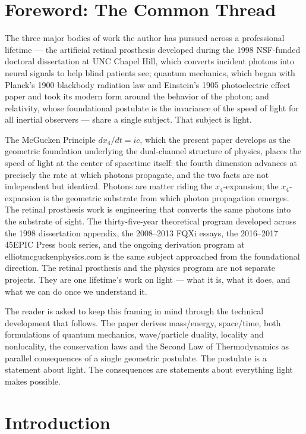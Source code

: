 \documentclass[11pt,a4paper]{article}
\begin{document}
\section*{Foreword: The Common Thread}

The three major bodies of work the author has pursued across a professional lifetime --- the artificial retinal prosthesis developed during the 1998 NSF-funded doctoral dissertation at UNC Chapel Hill, which converts incident photons into neural signals to help blind patients see; quantum mechanics, which began with Planck's 1900 blackbody radiation law and Einstein's 1905 photoelectric effect paper and took its modern form around the behavior of the photon; and relativity, whose foundational postulate is the invariance of the speed of light for all inertial observers --- share a single subject. That subject is light.

The McGucken Principle $dx_4/dt = ic$, which the present paper develops as the geometric foundation underlying the dual-channel structure of physics, places the speed of light at the center of spacetime itself: the fourth dimension advances at precisely the rate at which photons propagate, and the two facts are not independent but identical. Photons are matter riding the $x_4$-expansion; the $x_4$-expansion is the geometric substrate from which photon propagation emerges. The retinal prosthesis work is engineering that converts the same photons into the substrate of sight. The thirty-five-year theoretical program developed across the 1998 dissertation appendix, the 2008--2013 FQXi essays, the 2016--2017 45EPIC Press book series, and the ongoing derivation program at elliotmcguckenphysics.com is the same subject approached from the foundational direction. The retinal prosthesis and the physics program are not separate projects. They are one lifetime's work on light --- what it is, what it does, and what we can do once we understand it.

The reader is asked to keep this framing in mind through the technical development that follows. The paper derives mass/energy, space/time, both formulations of quantum mechanics, wave/particle duality, locality and nonlocality, the conservation laws and the Second Law of Thermodynamics as parallel consequences of a single geometric postulate. The postulate is a statement about light. The consequences are statements about everything light makes possible.

\section{Introduction}
\end{document}
